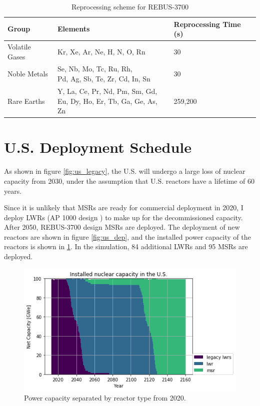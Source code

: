\begin{table}[h]
	\centering
	\caption{Reprocessing scheme for REBUS-3700}
	\label{tab:rebus_reproc}
	\begin{tabular}{lll}
		\hline
		Group & Elements & Reprocessing Time (s) \\
		\hline
		Volatile Gases & Kr, Xe, Ar, Ne, H, N, O, Rn & 30 \\
		Noble Metals & \shortstack{Se, Nb, Mo, Tc, Ru, Rh,\\ Pd, Ag, Sb, Te, Zr, Cd, In, Sn} & 30 \\
		Rare Earths & \shortstack{Y, La, Ce, Pr, Nd, Pm, Sm, Gd, \\ Eu, Dy, Ho, Er, Tb, Ga, Ge, As, Zn} & 259,200 \\
		\hline
	\end{tabular}
\end{table}



\section{U.S. Deployment Schedule}

As shown in figure \ref{fig:us_legacy}, the U.S. will
undergo a large loss of nuclear capacity from 2030, under the
assumption that U.S. reactors have a lifetime of 60 years.

Since it is unlikely that \glspl{MSR} are ready for
commercial deployment in 2020, I deploy \glspl{LWR} (AP 1000 design \cite{sutharshan_ap1000tm_2011})
to make up for the decommissioned capacity. After 2050,
REBUS-3700 design \glspl{MSR} are deployed. The deployment of new reactors
are shown in figure \ref{fig:us_dep}, and the installed
power capacity of the reactors is shown in \ref{fig:us_pow}.
In the simulation, 84 additional \glspl{LWR} and 95 \glspl{MSR}
are deployed.

\begin{figure}[htbp!]
	\begin{center}
		\includegraphics[scale=0.7]{./images/us/power_plot.png}
	\end{center}
	\caption{Power capacity separated by reactor type from 2020.}
	\label{fig:us_pow}
\end{figure}

